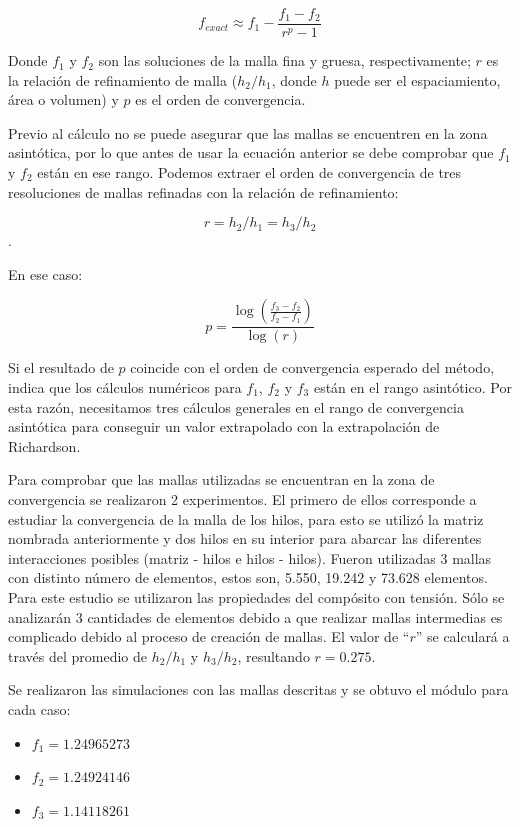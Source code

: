 \documentclass[12pt,letterpaper]{article}
\numberwithin{equation}{section}
\begin{document}
$$f_{exact}\approx f_1-\frac{f_1-f_2}{r^p-1}$$

Donde $f_1$ y $f_2$ son las soluciones de la malla fina y gruesa,
respectivamente; $r$ es la relación de refinamiento de malla ($h_2/h_1$, donde $h$ puede ser el espaciamiento, área o volumen) y $p$ es el orden de convergencia.

Previo al cálculo no se puede asegurar que las mallas se encuentren en la zona asintótica, por lo que antes de usar la ecuación anterior se debe comprobar que $f_1$ y $f_2$ están en ese rango. Podemos extraer el orden de convergencia de tres resoluciones de mallas refinadas con la relación de refinamiento: 

$$r = h_2/h_1=h_3/h_2$$. 

En ese caso:

$$p = \frac{\log(\frac{f_3-f_2}{f_2-f_1})}{\log(r)}$$

Si el resultado de $p$ coincide con el orden de convergencia esperado del método, indica que los cálculos numéricos para $f_1$, $f_2$ y $f_3$ están en el rango asintótico. Por esta razón, necesitamos tres cálculos generales en el rango de convergencia asintótica para conseguir un valor extrapolado con la extrapolación de Richardson. 

Para comprobar que las mallas utilizadas se encuentran en la zona de convergencia se realizaron 2 experimentos. El primero de ellos corresponde a estudiar la convergencia de la malla de los hilos, para esto se utilizó la matriz nombrada anteriormente y dos hilos en su interior para abarcar las diferentes interacciones posibles (matriz - hilos e hilos - hilos). Fueron utilizadas 3 mallas con distinto número de elementos, estos son, 5.550, 19.242 y 73.628 elementos.  Para este estudio se utilizaron las propiedades del compósito con tensión. Sólo se analizarán 3 cantidades de elementos debido a que realizar mallas intermedias es complicado debido al proceso de creación de mallas. El valor de ``$r$'' se calculará a través del promedio de $h_2/h_1$ y $h_3/h_2$, resultando $r=0.275$. 

\pagebreak
Se realizaron las simulaciones con las mallas descritas y se obtuvo el módulo para cada caso:

\begin{itemize}
	\item $f_1 = 1.24965273$
	\item $f_2 = 1.24924146$
	\item $f_3 = 1.14118261$
\end{itemize}
\end{document}
